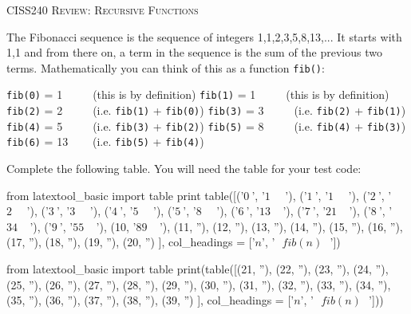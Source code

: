 \textsc{CISS240 Review: Recursive Functions}

The Fibonacci sequence is the sequence of integers 1,1,2,3,5,8,13,...
It starts with 1,1
and from there on, a term in the sequence is the sum of the previous two terms.
Mathematically you can think of this as a function \verb!fib()!:

\begin{tightlist}
  \li \verb!fib(0)! = 1 \verb!    ! (this is by definition)
  \li \verb!fib(1)! = 1 \verb!    ! (this is by definition)
  \li \verb!fib(2)! = 2 \verb!    ! (i.e. \verb!fib(1)! + \verb!fib(0)!)
  \li \verb!fib(3)! = 3 \verb!    ! (i.e. \verb!fib(2)! + \verb!fib(1)!)
  \li \verb!fib(4)! = 5 \verb!    ! (i.e. \verb!fib(3)! + \verb!fib(2)!)
  \li \verb!fib(5)! = 8 \verb!    ! (i.e. \verb!fib(4)! + \verb!fib(3)!)
  \li \verb!fib(6)! = 13 \verb!   ! (i.e. \verb!fib(5)! + \verb!fib(4)!)
\end{tightlist}

Complete the following table. You will need the table for your test code:

\begin{python}
from latextool_basic import table
print table([('$0\ $', '$1\ \ \ \ \ \ $'),
             ('$1\ $', '$1\ \ \ \ \ \ $'),
             ('$2\ $', '$2\ \ \ \ \ \ $'),
             ('$3\ $', '$3\ \ \ \ \ \ $'),
             ('$4\ $', '$5\ \ \ \ \ \ $'),
             ('$5\ $', '$8\ \ \ \ \ \ $'),
             ('$6\ $', '$13\ \ \ \ \ $'),
             ('$7\ $', '$21\ \ \ \ \ $'),
             ('$8\ $', '$34\ \ \ \ \ $'),
             ('$9\ $', '$55\ \ \ \ \ $'),
             (10, '$89\ \ \ \ \ $'),
             (11, ''),
             (12, ''),
             (13, ''),
             (14, ''),
             (15, ''),
             (16, ''),
             (17, ''),
             (18, ''),
             (19, ''),
             (20, '')
            ],
            col_headings = ['$n$', '$\ \ \ fib(n)\ \ \ $'])
\end{python}




\newpage
\begin{python}
from latextool_basic import table
print(table([(21, ''),
             (22, ''),
             (23, ''),
             (24, ''),
             (25, ''),
             (26, ''),
             (27, ''),
             (28, ''),
             (29, ''),
             (30, ''),
             (31, ''),
             (32, ''),
             (33, ''),
             (34, ''),
             (35, ''),
             (36, ''),
             (37, ''),
             (38, ''),
             (39, '')
            ],
            col_headings = ['$n$', '$\ \ \ fib(n)\ \ \ $']))
\end{python}

